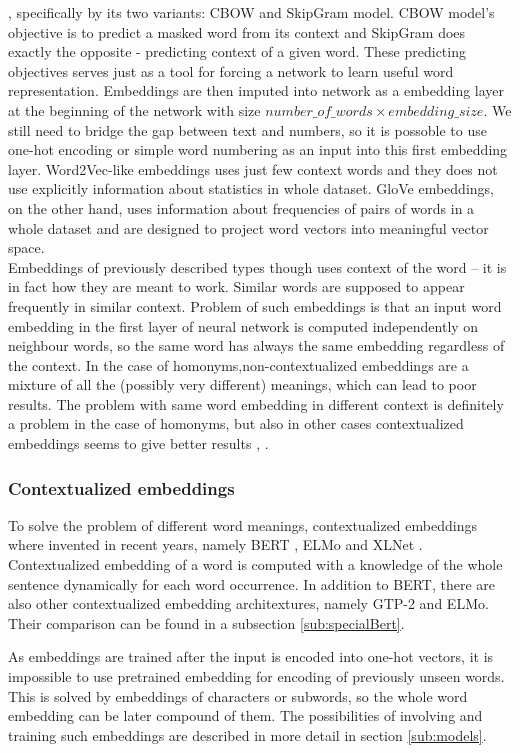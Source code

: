 , specifically by its two variants: CBOW and SkipGram model.
CBOW model's objective is to predict a masked word from its context and SkipGram does exactly the opposite - predicting context of a given word. %
These predicting objectives serves just as a tool for forcing a network to learn useful word representation.  Embeddings are then imputed into network as a embedding layer at the beginning of the network with size $number\_of\_words \times embedding\_size$. We still need to bridge the gap between text and numbers, so it is possoble to use one-hot encoding or simple word numbering as an input into this first embedding layer.  Word2Vec-like embeddings uses just few context words and they does not use explicitly information about statistics in whole dataset. GloVe \citep{Pennington} embeddings, on the other hand, uses information about frequencies of pairs of words in a whole dataset and are designed to project word vectors into meaningful vector space. 
\\
Embeddings of previously described types though uses context of the word -- it is in fact how they are meant to work. Similar words are supposed to appear frequently in similar context. Problem of such embeddings is that an input word embedding in the first layer of neural network is computed independently on neighbour words, so the same word has always the same embedding regardless of the context. In the case of homonyms,non-contextualized embeddings are a mixture of all the (possibly very different) meanings, which can lead to poor results.  The problem with same word embedding in different context is definitely a problem in the case of homonyms, but also in other cases contextualized embeddings seems to give better results \citep{Straka2019a}, \citep{Liu2020}.

\subsubsection{Contextualized embeddings}
To solve the problem of different word meanings, contextualized embeddings where invented in recent years, namely BERT \citep{Devlin2019}, ELMo \citep{Peters2018} and XLNet \citep{Yang2019}. %
Contextualized embedding of a word is computed with a knowledge of the whole sentence dynamically for each word occurrence.
In addition to BERT, there are also other contextualized embedding architextures, namely GTP-2 %
and ELMo. Their comparison can be found in a subsection \ref{sub:specialBert}. 
\par
As embeddings are trained after the input is encoded into one-hot vectors, it is impossible to use pretrained embedding for encoding of previously unseen words. This is solved by embeddings of characters or subwords, so the whole word embedding can be later compound of them. The possibilities of involving and training such embeddings are described in more detail in section \ref{sub:models}.


